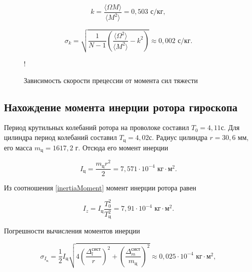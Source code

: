 \documentclass[a4paper,12pt]{article} %
\begin{document}
\begin{equation}
    k = \frac{\langle \Omega M \rangle}{\langle M^2 \rangle} = 0,503 \text{ с/кг},
\end{equation}

\begin{equation}
    \sigma_k = \sqrt{\frac{1}{N - 1}(\frac{\langle \Omega^2 \rangle}{\langle M^2 \rangle} - k^2)} \approx 0,002 \text{ с/кг}.
\end{equation}

\begin{figure}
\centering
{} {!} {
}
\caption{Зависимость скорости прецессии от момента сил тяжести}
\label{fig:precessionSpeds}
\end{figure}

\subsection{Нахождение момента инерции ротора гироскопа}

Период крутильных колебаний ротора на проволоке составил $ T_0 = 4,11 с $. Для цилиндра период колебаний составил $ T_\text{ц} = 4,02 с $. Радиус цилиндра $ r = 30,6 $ мм, его масса $ m_\text{ц} = 1617,2 $ г. Отсюда его момент инерции

\begin{equation}
    I_\text{ц} = \frac{m_\text{ц}r^2}{2} = 7,571 \cdot 10^{-4} \text{ кг} \cdot \text{м}^2.
\end{equation}

Из соотношения \eqref{inertiaMoment} момент инерции ротора равен

\begin{equation}
    I_z = I_\text{ц}\frac{T_0^2}{T_\text{ц}^2} = 7,91 \cdot 10^{-4} \text{ кг} \cdot \text{м}^2.
\end{equation}

Погрешности вычисления моментов инерции

\begin{equation}
    \sigma_{I_\text{ц}} = \frac{1}{2} I_\text{ц} \sqrt{4(\frac{\Delta_l^\text{сист}}{r})^2 + (\frac{\Delta_m^\text{сист}}{m_\text{ц}})^2} \approx 0,025 \cdot 10^{-4}  \text{ кг} \cdot \text{м}^2,
\end{equation}
\end{document}
